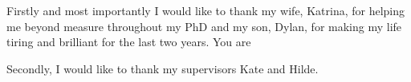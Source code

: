 \begin{acknowledgements}



Firstly and most importantly I would like to thank my wife, Katrina, for helping me beyond measure throughout my PhD and my son, Dylan, for making my life tiring and brilliant for the last two years.
You are 




Secondly, I would like to thank my supervisors Kate and Hilde.






\end{acknowledgements}

\setcounter{tocdepth}{2} 

\tableofcontents
\listoffigures
\listoftables

